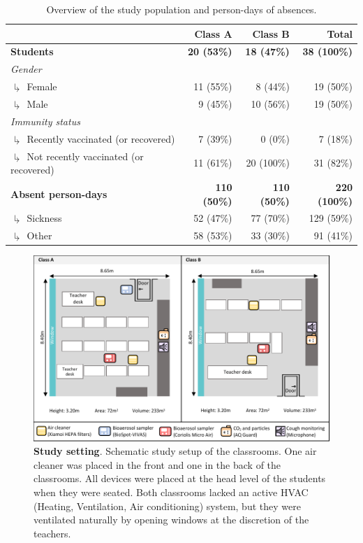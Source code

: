 \documentclass[fleqn,11pt]{wlscirep}
\begin{document}
\clearpage

\begin{table}[!htpb]
    \centering
    \caption{Overview of the study population and person-days of absences.}
    \label{tab:cases-overview-school}
    \footnotesize
    \renewcommand{\arraystretch}{1.5}
    \begin{tabular}{l r r r}
    \toprule
         &  Class A & Class B & Total \\ \midrule 
        \textbf{Students} & \textbf{20 (53\%)} & \textbf{18 (47\%)} & \textbf{38 (100\%)} \\
        \emph{Gender} \\
        $\drsh$ Female & 11 (55\%) & 8 (44\%) & 19 (\hphantom{0}50\%) \\
        $\drsh$ Male & 9 (45\%) & 10 (56\%) & 19 (\hphantom{0}50\%) \\
        \emph{Immunity status} \\
        $\drsh$ Recently vaccinated (or recovered) & 7 (39\%) & 0 (0\%) & 7 (\hphantom{0}18\%) \\
        $\drsh$ Not recently vaccinated (or recovered) & 11 (61\%) & 20 (100\%) & 31 (\hphantom{0}82\%) \\
        \textbf{Absent person-days} & \textbf{110 (50\%)} & \textbf{110 (50\%)} & \textbf{220 (100\%)} \\
        $\drsh$ Sickness & 52 (47\%) & 77 (70\%) & 129 (\hphantom{0}59\%) \\
        $\drsh$ Other & 58 (53\%) & 33 (30\%) & 91 (\hphantom{0}41\%) \\
        \bottomrule
    \end{tabular} 
\end{table}

\clearpage

\begin{figure}[!htpb]
    \centering
    \includegraphics{../study_setting.pdf}
    \caption{\textbf{Study setting}. Schematic study setup of the classrooms. One air cleaner was placed in the front and one in the back of the classrooms. All devices were placed at the head level of the students when they were seated. Both classrooms lacked an active HVAC (Heating, Ventilation, Air conditioning) system, but they were ventilated naturally by opening windows at the discretion of the teachers. }
    \label{fig:study-setup}
\end{figure}
\end{document}

